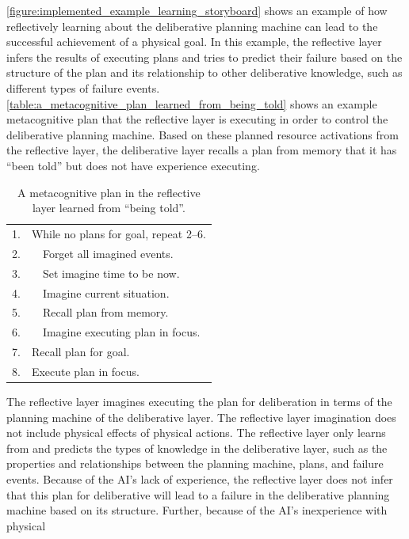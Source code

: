 {\mbox{\autoref{figure:implemented_example_learning_storyboard}}}
shows an example of how reflectively learning about the deliberative
planning machine can lead to the successful achievement of a physical
goal.  In this example, the reflective layer infers the results of
executing plans and tries to predict their failure based on the
structure of the plan and its relationship to other deliberative
knowledge, such as different types of failure events.
{\mbox{\autoref{table:a_metacognitive_plan_learned_from_being_told}}}
shows an example metacognitive plan that the reflective layer is
executing in order to control the deliberative planning machine.
Based on these planned resource activations from the reflective layer,
the deliberative layer recalls a plan from memory that it has ``been
told'' but does not have experience executing.
\begin{table}
\centering
\begin{tabular}{|rl|}
\hline
 1. & While no plans for goal, repeat 2--6.\\
 2. & ~~Forget all imagined events.\\
 3. & ~~Set imagine time to be now.\\
 4. & ~~Imagine current situation.\\
 5. & ~~Recall plan from memory.\\
 6. & ~~Imagine executing plan in focus.\\
 7. & Recall plan for goal.\\
 8. & Execute plan in focus.\\
\hline
\end{tabular}
\caption[A metacognitive plan in the reflective layer learned from
  ``being told''.]{A metacognitive plan in the reflective layer
  learned from ``being told''.}
\label{table:a_metacognitive_plan_learned_from_being_told}
\end{table}
The reflective layer imagines executing the plan for deliberation in
terms of the planning machine of the deliberative layer.  The
reflective layer imagination does not include physical effects of
physical actions.  The reflective layer only learns from and predicts
the types of knowledge in the deliberative layer, such as the
properties and relationships between the planning machine, plans, and
failure events.  Because of the AI's lack of experience, the
reflective layer does not infer that this plan for deliberative will
lead to a failure in the deliberative planning machine based on its
structure.  Further, because of the AI's inexperience with physical
